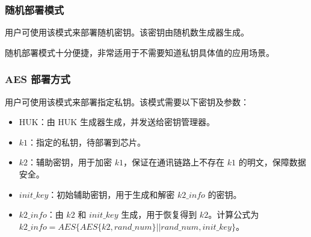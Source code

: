 \documentclass[main\_\_CN.tex]{subfiles}
\begin{document}
\subsubsection{随机部署模式}
用户可使用该模式来部署随机密钥。该密钥由随机数生成器生成。
\vspace{-0.5em}
\begin{tiplisting}
随机部署模式十分便捷，非常适用于不需要知道私钥具体值的应用场景。
\end{tiplisting}

\subsubsection{AES 部署方式}
用户可使用该模式来部署指定私钥。该模式需要以下密钥及参数：

\begin{itemize}
    \item HUK：由 HUK 生成器生成，并发送给密钥管理器。
    \item \hyperref[para:k1]{\begin{math}k1\end{math}}：指定的私钥，待部署到芯片。
    \item \hyperref[para:k2]{\begin{math}k2\end{math}}：辅助密钥，用于加密 \hyperref[para:k1]{\begin{math}k1\end{math}}，保证在通讯链路上不存在 \hyperref[para:k1]{\begin{math}k1\end{math}} 的明文，保障数据安全。
    \item \hyperref[para:initkey]{\begin{math}init\_key\end{math}}：初始辅助密钥，用于生成和解密 \hyperref[para:k2info]{\begin{math}k2\_info\end{math}} 的密钥。
    \item \hyperref[para:k2info]{\begin{math}k2\_info\end{math}}：由 \hyperref[para:k2]{\begin{math}k2\end{math}} 和 \hyperref[para:initkey]{\begin{math}init\_key\end{math}} 生成，用于恢复得到 \hyperref[para:k2]{\begin{math}k2\end{math}}。计算公式为 \begin{math}k2\_info = AES\{AES\{k2,rand\_num\}||rand\_num,init\_key\}\end{math}。
\end{itemize}
\end{document}

